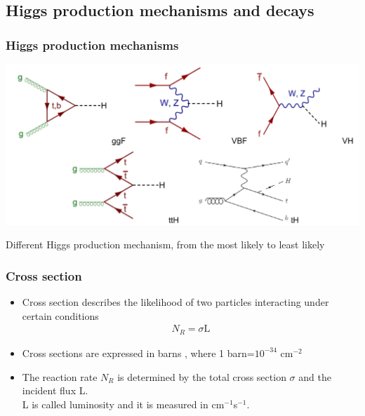 \documentclass[11pt]{beamer}
\begin{document}
{\nologo
\begin{frame}
\subsection{Higgs production mechanisms and decays}
\frametitle{Higgs production mechanisms}

\begin{center}
\includegraphics[scale=0.4]{figures/pg.png}
\end{center}
\small{Different Higgs production mechanism, from the most likely to least likely}
\end{frame}
}

\begin{frame}
\frametitle{Cross section}
\begin{itemize}
\item Cross section describes the likelihood of two particles interacting under certain conditions\cite{1}\cite{6}
\begin{align}
N_R=\sigma \text{L}
\end{align}
\item Cross sections are expressed in barns , where 1 barn=$10^{-34}$ cm$^{-2}$ 
\item The reaction rate $N_R$ is determined by the total cross section $\sigma$ and the incident flux L.\\
L is called luminosity and it is measured in cm$^{-1}$s$^{-1}$.\cite{6}
\end{itemize}
\end{frame}
\end{document}

